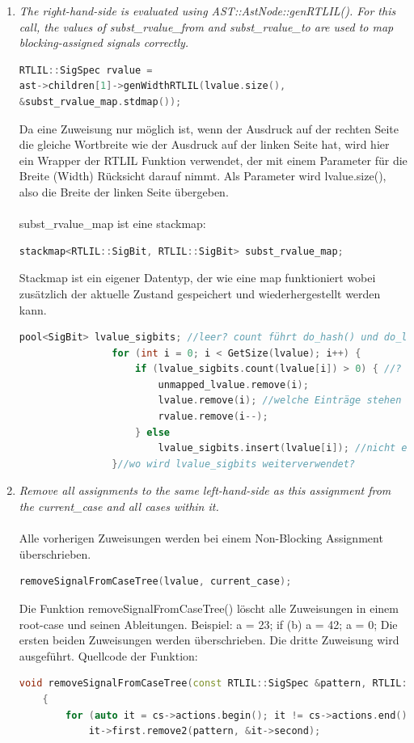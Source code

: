 \documentclass[11pt]{report}
\begin{document}
\begin{enumerate}
  \item \textit{The right-hand-side is evaluated using AST::AstNode::genRTLIL(). For this call, the values of subst\_rvalue\_from and subst\_rvalue\_to are used to map blocking-assigned signals correctly.}
\begin{lstlisting}[language=C++]
RTLIL::SigSpec rvalue = 
ast->children[1]->genWidthRTLIL(lvalue.size(), 
&subst_rvalue_map.stdmap());
\end{lstlisting}   
Da eine Zuweisung nur möglich ist, wenn der Ausdruck auf der rechten Seite die gleiche Wortbreite wie der Ausdruck auf der linken Seite hat, wird hier ein Wrapper der RTLIL Funktion verwendet, der mit einem Parameter für die Breite (Width) Rücksicht darauf nimmt. Als Parameter wird lvalue.size(), also die Breite der linken Seite übergeben.\\
\\
subst\_rvalue\_map ist eine stackmap:
\begin{lstlisting}[language=C++]
stackmap<RTLIL::SigBit, RTLIL::SigBit> subst_rvalue_map;
\end{lstlisting}

Stackmap ist ein eigener Datentyp, der wie eine map funktioniert wobei zusätzlich der aktuelle Zustand gespeichert und wiederhergestellt werden kann.
\begin{lstlisting}[language=C++]
				pool<SigBit> lvalue_sigbits; //leer? count führt do_hash() und do_lookup() aus
				for (int i = 0; i < GetSize(lvalue); i++) {
					if (lvalue_sigbits.count(lvalue[i]) > 0) { //? bei nicht-vorkommen einfügen, sonst entfernen
						unmapped_lvalue.remove(i);
						lvalue.remove(i); //welche Einträge stehen drin?
						rvalue.remove(i--);
					} else
						lvalue_sigbits.insert(lvalue[i]); //nicht einfügen, weil vorhanden
				}//wo wird lvalue_sigbits weiterverwendet?

\end{lstlisting}
  \item \textit{Remove all assignments to the same left-hand-side as this assignment from the current\_case and all
cases within it.}
\\
\\
Alle vorherigen Zuweisungen werden bei einem Non-Blocking Assignment überschrieben.
\begin{lstlisting}[language=C++]
removeSignalFromCaseTree(lvalue, current_case);
\end{lstlisting}
Die Funktion removeSignalFromCaseTree() löscht alle Zuweisungen in einem root-case und seinen Ableitungen. Beispiel: a = 23; if (b) a = 42; a = 0; Die ersten beiden Zuweisungen werden überschrieben. Die dritte Zuweisung wird ausgeführt.
Quellcode der Funktion:
\begin{lstlisting}[language=C++]
void removeSignalFromCaseTree(const RTLIL::SigSpec &pattern, RTLIL::CaseRule *cs)
	{
		for (auto it = cs->actions.begin(); it != cs->actions.end(); it++)
			it->first.remove2(pattern, &it->second);


\end{lstlisting}
\end{enumerate}
\end{document}
